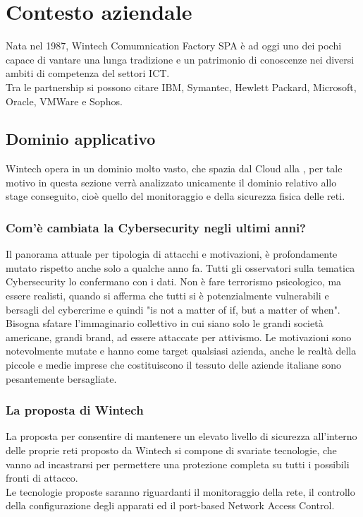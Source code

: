 \documentclass[Tesi.tex]{subfiles}
\begin{document}
\chapter{Contesto aziendale}

Nata nel 1987, Wintech Comumnication Factory SPA è ad oggi uno dei pochi  capace di vantare una lunga tradizione e un patrimonio di conoscenze nei diversi ambiti di competenza del settori ICT. \\
Tra le partnership si possono citare IBM, Symantec, Hewlett Packard, Microsoft, Oracle, VMWare e Sophos.


\section{Dominio applicativo}
Wintech opera in un dominio molto vasto, che spazia dal Cloud alla , per tale motivo in questa sezione verrà analizzato unicamente il dominio relativo allo stage conseguito, cioè quello del monitoraggio e della sicurezza fisica delle reti. \\

\subsection{Com'è cambiata la Cybersecurity negli ultimi anni?}
Il panorama attuale per tipologia di attacchi e motivazioni, è profondamente mutato rispetto anche solo a qualche anno fa. Tutti gli osservatori sulla tematica Cybersecurity lo confermano con i dati. Non è fare terrorismo psicologico, ma essere realisti, quando si afferma che tutti si è potenzialmente vulnerabili e bersagli del cybercrime e quindi "is not a matter of if, but a matter of when". Bisogna sfatare l’immaginario collettivo in cui siano solo le grandi società americane, grandi brand, ad essere attaccate per attivismo. Le motivazioni sono notevolmente mutate e hanno come target qualsiasi azienda, anche le realtà della piccole e medie imprese che costituiscono il tessuto delle aziende italiane sono pesantemente bersagliate.

\subsection{La proposta di Wintech}
La proposta per consentire di mantenere un elevato livello di sicurezza all'interno delle proprie reti proposto da Wintech si compone di svariate tecnologie, che vanno ad 
incastrarsi
per permettere una protezione completa su tutti i possibili fronti di attacco. \\
Le tecnologie proposte saranno riguardanti il monitoraggio della rete, il controllo della configurazione degli apparati ed il port-based Network Access Control.
\end{document}
